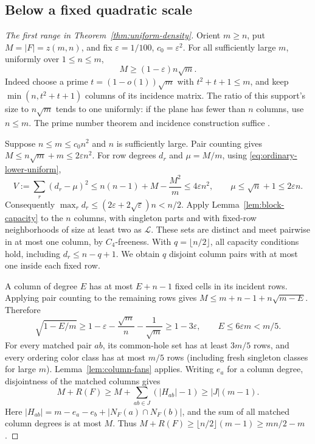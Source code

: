 \documentclass[11pt,a4paper]{article}
\theoremstyle{definition}
\begin{document}
\subsection{Below a fixed quadratic scale}

\begin{proof}[The first range in Theorem~\ref{thm:uniform-density}]
Orient $m\ge n$, put $M=|F|=z(m,n)$, and fix
$\varepsilon=1/100$, $c_0=\varepsilon^2$.
For all sufficiently large $m$, uniformly over $1\le n\le m$,
\begin{equation}\label{eq:ordinary-lower-uniform}
 M\ge(1-\varepsilon)n\sqrt m.
\end{equation}
Indeed choose a prime $t=(1-o(1))\sqrt m$ with $t^2+t+1\le m$,
and keep $\min(n,t^2+t+1)$ columns of its incidence matrix.
The ratio of this support's size to $n\sqrt m$ tends to one uniformly:
if the plane has fewer than $n$ columns, use $n\le m$.
The prime number theorem and incidence construction suffice
\cite{Singer,Hadamard}.

Suppose $n\le m\le c_0n^2$ and $n$ is sufficiently large.
Pair counting gives $M\le n\sqrt m+m\le2\varepsilon n^2$.
For row degrees $d_r$ and $\mu=M/m$, using
\eqref{eq:ordinary-lower-uniform},
\[
 V:=\sum_r(d_r-\mu)^2
 \le n(n-1)+M-\frac{M^2}{m}\le4\varepsilon n^2,
 \qquad \mu\le\sqrt n+1\le2\varepsilon n.
\]
Consequently $\max_r d_r\le(2\varepsilon+2\sqrt\varepsilon)n<n/2$.
Apply Lemma~\ref{lem:block-capacity} to the $n$ columns, with singleton
parts and with fixed-row neighborhoods of size at least two as
$\mathcal L$. These sets are distinct and meet pairwise in at most one
column, by $C_4$-freeness. With $q=\lfloor n/2\rfloor$, all capacity
conditions hold, including $d_r\le n-q+1$.
We obtain $q$ disjoint column pairs with at most one inside each fixed row.

A column of degree $E$ has at most $E+n-1$ fixed cells in its incident
rows. Applying pair counting to the remaining rows gives
$M\le m+n-1+n\sqrt{m-E}$. Therefore
\[
 \sqrt{1-E/m}\ge1-\varepsilon-\frac{\sqrt m}{n}
                         -\frac1{\sqrt m}\ge1-3\varepsilon,
 \qquad E\le6\varepsilon m<m/5.
\]
For every matched pair $ab$, its common-hole set has at least $3m/5$
rows, and every ordering color class has at most $m/5$ rows (including
fresh singleton classes for large $m$). Lemma~\ref{lem:column-fans} applies.
Writing $e_a$ for a column degree, disjointness of the matched columns gives
\begin{equation}\label{eq:fan-exact-sum}
 M+R(F)\ge M+\sum_{ab\in J}(|H_{ab}|-1)
          \ge |J|(m-1).
\end{equation}
Here $|H_{ab}|=m-e_a-e_b+|N_F(a)\cap N_F(b)|$, and the sum of all
matched column degrees is at most $M$. Thus
$M+R(F)\ge\lfloor n/2\rfloor(m-1)\ge mn/2-m$.
\end{proof}
\end{document}
